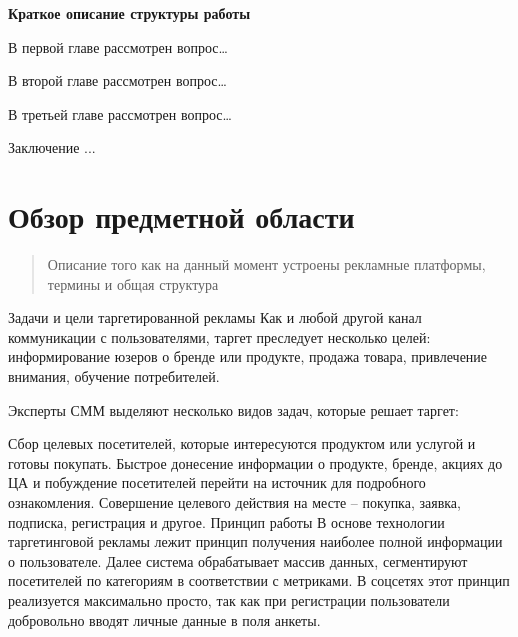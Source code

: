 \documentclass[times]{itmo-student-thesis}
\begin{document}


\bigbreak
{\large \textbf{Краткое описание структуры работы}}
\bigbreak

В первой главе рассмотрен вопрос…

В второй главе рассмотрен вопрос…

В третьей главе рассмотрен вопрос…

Заключение ...








\chapter{Обзор предметной области}


\startrelatedwork %

\begin{quotation}
  Описание того как на данный момент устроены рекламные платформы, термины и общая структура
\end{quotation}

Задачи и цели таргетированной рекламы
Как и любой другой канал коммуникации с пользователями, таргет преследует несколько целей: информирование юзеров о бренде или продукте, продажа товара, привлечение внимания, обучение потребителей.

Эксперты СММ выделяют несколько видов задач, которые решает таргет:

Сбор целевых посетителей, которые интересуются продуктом или услугой и готовы покупать.
Быстрое донесение информации о продукте, бренде, акциях до ЦА и побуждение посетителей перейти на источник для подробного ознакомления.
Совершение целевого действия на месте – покупка, заявка, подписка, регистрация и другое.
Принцип работы
В основе технологии таргетинговой рекламы лежит принцип получения наиболее полной информации о пользователе. Далее система обрабатывает массив данных, сегментируют посетителей по категориям в соответствии с метриками. В соцсетях этот принцип реализуется максимально просто, так как при регистрации пользователи добровольно вводят личные данные в поля анкеты.
\end{document}
